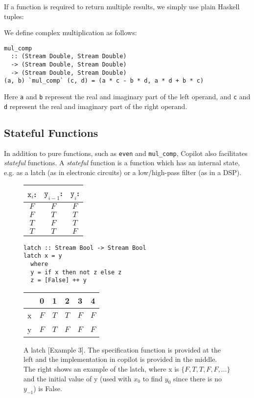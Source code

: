 If a function is required to return multiple results, we simply use plain
Haskell tuples:

\begin{example}
We define complex multiplication as follows:
%
\begin{lstlisting}[language = Copilot, frame = single]
mul_comp
  :: (Stream Double, Stream Double)
  -> (Stream Double, Stream Double)
  -> (Stream Double, Stream Double)
(a, b) `mul_comp` (c, d) = (a * c - b * d, a * d + b * c)
\end{lstlisting}
%
Here {\tt a} and {\tt b} represent the real and imaginary part of the left
operand, and {\tt c} and {\tt d} represent the real and imaginary part
of the right operand.
\end{example}

\subsection{Stateful Functions} \label{sec:stateful}

In addition to pure functions, such as {\tt even} and {\tt mul\_comp},
Copilot also facilitates \emph{stateful} functions. A \emph{stateful} function
is a function which has an internal state, e.g. as a latch (as in electronic
circuits) or a low/high-pass filter (as in a DSP).

\begin{figure*}
\begin{minipage}{0.25\linewidth}
\begin{tabular}{c|c||c}
$\mathtt{x}_i$: & $\mathtt{y}_{i-1}$: & $\mathtt{y}_i$:\\
\hline
$F$ & $F$ & $F$ \\
\hline
$F$ & $T$ & $T$ \\
\hline
$T$ & $F$ & $T$ \\
\hline
$T$ & $T$ & $F$
\end{tabular}
\end{minipage}
\begin{minipage}{0.35\linewidth}
\begin{lstlisting}[frame=none]
latch :: Stream Bool -> Stream Bool
latch x = y
  where
  y = if x then not z else z
  z = [False] ++ y
\end{lstlisting}
\end{minipage}
\hspace{1cm}
\begin{minipage}{0.3\linewidth}
\begin{tabular}{c|c|c|c|c|c}
   & 0 & 1 & 2 & 3 & 4\\
\hline
x & $F$ & $T$ & $T$ & $F$ & $F$ \\
\hline
y & $F$ & $T$ & $F$ & $F$ & $F$ \\
\end{tabular}
\end{minipage}
\caption{A latch [Example 3]. The specification function is provided at the left and the
implementation in copilot is provided in the middle. The right shows an example of
the latch, where x is $\{F, T, T, F, F, \dots \}$ and the initial value of y (used with $x_0$ to find
$y_0$ since there is no $y_{-1}$) is False.}
\label{fig:jk_latch}
\end{figure*}

